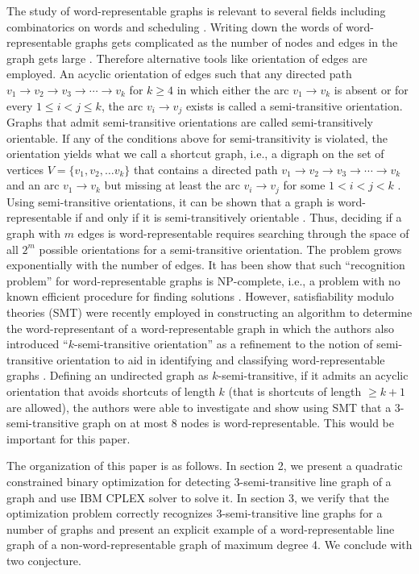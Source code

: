 \documentclass{article}
\begin{document}
 
The study of word-representable graphs is relevant to several fields including combinatorics on words and scheduling \cite{KitaevLozin}. Writing down the words of word-representable graphs gets complicated as the number of nodes and edges in the graph gets large \cite{alternation}. Therefore alternative tools like orientation of edges are employed.
An acyclic orientation of edges such that any directed path $v_{1} \rightarrow v_{2}\rightarrow v_{3} \rightarrow \cdots \rightarrow v_{k}$ for $k\geq 4$ in which either the arc $v_{1}\rightarrow v_{k}$ is absent or for every $1\leq i<j\leq k$, the arc $v_{i}\rightarrow v_{j}$ exists is called a semi-transitive orientation. Graphs that admit semi-transitive orientations are called semi-transitively orientable. If any of the conditions above for semi-transitivity is violated, the orientation yields what we call a shortcut graph, i.e., a digraph on the set of vertices $V=\{v_{1},v_{2},\ldots v_{k}\}$ that contains a directed path $v_{1} \rightarrow v_{2}\rightarrow v_{3} \rightarrow \cdots \rightarrow v_{k}$ and an arc $v_{1}\rightarrow v_{k}$ but missing at least the arc $v_{i}\rightarrow v_{j}$ for some $1< i<j< k$ \cite{Kitaev2017}.  Using semi-transitive orientations, it can be shown that a graph is word-representable if and only if it is semi-transitively orientable \cite{HALLDORSSON2016164}. Thus, deciding if a graph with $m$ edges is word-representable requires searching through the space of all $2^{m}$ possible orientations for a semi-transitive orientation. The problem grows exponentially with the number of edges. It has been show that such ``recognition problem'' for word-representable graphs is NP-complete, i.e., a problem with no known efficient procedure for finding solutions \cite{HALLDORSSON2016164}. However, satisfiability modulo theories (SMT) were recently employed in constructing an algorithm to determine the word-representant of a word-representable graph %
in which the authors also introduced ``$k$-semi-transitive orientation'' as a refinement to the notion of semi-transitive orientation to aid in identifying and classifying word-representable graphs \cite{SMT2019}. 
Defining an undirected graph as $k$-semi-transitive, if it admits an acyclic orientation that avoids shortcuts of length $k$ (that is shortcuts of length $\geq k+1$ are allowed), the authors were able to investigate and show using SMT that a $3$-semi-transitive graph on at most $8$ nodes is word-representable. This would be important for this paper. 

The organization of this paper is as follows. In section 2, we present a quadratic constrained binary optimization for detecting 3-semi-transitive line graph of a graph and use IBM CPLEX solver to solve it. In section 3, we verify that the optimization problem correctly recognizes 3-semi-transitive line graphs for a number of graphs and present an explicit example of a word-representable line graph of a non-word-representable graph of maximum degree 4.
We conclude with two conjecture.
\end{document}
